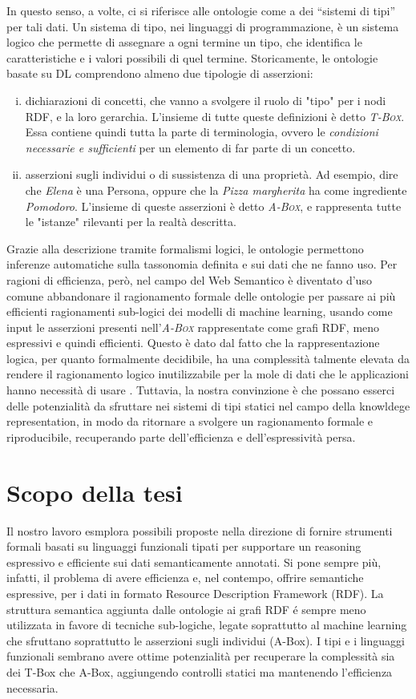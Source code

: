 In questo senso, a volte, ci si riferisce alle ontologie come a dei “sistemi di tipi” per tali dati. Un sistema di tipo, nei linguaggi di programmazione, 
è un sistema logico che permette di assegnare a ogni termine un tipo, che identifica le caratteristiche e i valori possibili di quel termine. Storicamente, 
le ontologie basate su DL comprendono almeno due tipologie di asserzioni:
\begin{enumerate}[i)]
	\item dichiarazioni di concetti, che vanno a svolgere il ruolo di "tipo" per i nodi RDF, e la loro gerarchia. L'insieme di tutte queste definizioni 
    è detto \textsc{\itshape T-Box}. Essa contiene quindi tutta la parte di terminologia, ovvero le \textit{condizioni necessarie e sufficienti} per un 
    elemento di far parte di un concetto.
	\item asserzioni sugli individui o di sussistenza di una proprietà. Ad esempio, dire che \textsl{Elena} è una Persona, oppure che la 
    \textsl{ Pizza margherita} ha come ingrediente \textsl{Pomodoro}. L'insieme di queste asserzioni è detto \textsc{\itshape A-Box}, e rappresenta 
    tutte le "istanze" rilevanti per la realtà descritta.
\end{enumerate}
Grazie alla descrizione tramite formalismi logici, le ontologie permettono inferenze automatiche sulla tassonomia definita e sui dati che ne fanno uso. 
Per ragioni di efficienza, però, nel campo del Web Semantico è diventato d'uso comune abbandonare il ragionamento formale delle ontologie per passare ai 
più efficienti ragionamenti sub-logici dei modelli di machine learning, usando come input le asserzioni presenti nell'\textsc{\itshape A-Box} rappresentate 
come grafi RDF, meno espressivi e quindi efficienti. Questo è dato dal fatto che la rappresentazione logica, per quanto formalmente decidibile, ha una 
complessità talmente elevata da rendere il ragionamento logico inutilizzabile per la mole di dati che le applicazioni hanno necessità di usare 
\cite{baader2017introductionDL}. Tuttavia, la nostra convinzione è che possano esserci delle potenzialità da sfruttare nei sistemi di tipi statici nel 
campo della knowldege representation, in modo da ritornare a svolgere un ragionamento formale e riproducibile, recuperando parte dell'efficienza e 
dell'espressività persa.
\section{Scopo della tesi}
Il nostro lavoro esmplora possibili proposte nella direzione di fornire strumenti formali basati su linguaggi funzionali tipati per supportare un reasoning
espressivo e efficiente sui dati semanticamente annotati. Si pone sempre più, infatti, il problema di avere efficienza e, nel contempo, offrire semantiche 
espressive, per i dati in formato Resource Description Framework (RDF). La struttura semantica aggiunta dalle ontologie ai grafi RDF \'e sempre meno utilizzata
in favore di tecniche sub-logiche, legate soprattutto al machine learning che sfruttano soprattutto le asserzioni sugli individui (A-Box). 
I tipi e i linguaggi funzionali sembrano avere ottime potenzialità per recuperare la complessità sia dei T-Box che A-Box, aggiungendo controlli statici
ma mantenendo l'efficienza necessaria.
